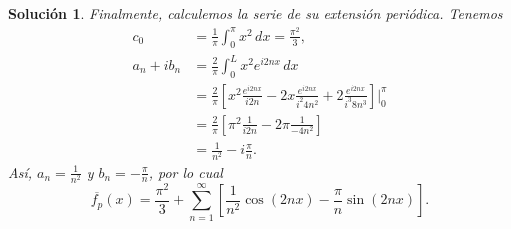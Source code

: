 \documentclass[11pt,letterpaper,draft]{report}
\newtheorem*{sol}{Solución}
\newcommand\<{\langle}
\renewcommand\>{\rangle}
\begin{document}
\begin{sol}
  Finalmente, calculemos la serie de su extensión periódica.
  Tenemos
  \begin{align*}
    c_0
    &= \frac{1}{\pi}\int_{0}^{\pi}x^{2}\,dx = \frac{\pi^{2}}{3}, \\
    a_n+ib_n
    &= \frac{2}{\pi}\int_{0}^{L}x^{2}e^{i 2nx}\,dx \\
    &= \frac{2}{\pi} \left[
      x^{2}\frac{e^{i 2nx}}{i 2n}
      -2x\frac{e^{i 2nx}}{i^{2}4n^{2}}
      +2 \frac{e^{i 2nx}}{i^{3} 8n^{3}}
    \right]\Big|_{0}^{\pi} \\
   &= \frac{2}{\pi} \left[
     \pi^{2}\frac{1}{i 2n}
     -2\pi \frac{1}{-4n^{2}}
   \right] \\
   &= \frac{1}{n^{2}}-i \frac{\pi}{n}.
  \end{align*}
  Así, $a_n=\frac{1}{n^{2}}$ y $b_n=-\frac{\pi}{n}$, por lo cual
  \[
    \overline{f_p}(x)
    =
    \frac{\pi^{2}}{3}
    +
    \sum_{n=1}^{\infty} \left[
      \frac{1}{n^{2}}\cos(2nx)
      -
      \frac{\pi}{n}\sin(2nx)
    \right]
  .\]
\end{sol}
\end{document}
